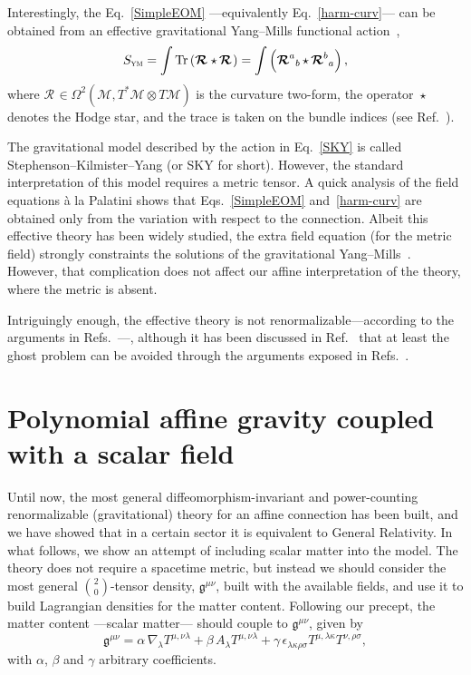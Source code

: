 \documentclass[aps,prd,12pt,twocolumn,superscriptaddress,showpacs,showkeys,reprint%
]{revtex4-1}
\DeclareMathOperator{\st}{\star}
\newcommand{\Mi}{\mathcal{M}}
\newcommand{\Rif}[2]{\boldsymbol{\mathcal{R}}^{{#1}}{}_{{#2}}}
\newcommand{\Tr}{\operatorname{Tr}}
\renewcommand{\(}{\left(}
\renewcommand{\)}{\right)}
\renewcommand{\[}{\left[}
\renewcommand{\]}{\right]}
\begin{document}
Interestingly, the Eq.~\eqref{SimpleEOM} ---equivalently Eq.~\eqref{harm-curv}--- can be obtained from an effective gravitational Yang--Mills functional action~\cite{stephenson1958quadratic,kilmister1961use,Yang1974}, %
\begin{equation}
  \label{SKY}
  S_{\textsc{ym}} = \int \Tr \left( \Rif{}{} \st \Rif{}{} \right) = \int \left( \Rif{a}{b} \st \Rif{b}{a} \right),
\end{equation}
where $\Rif{}{} \in \Omega^2(\Mi, T^*\Mi \otimes T\Mi)$ is the curvature two-form, the operator $\st$ denotes the Hodge star, and the trace is taken on the bundle indices (see Ref.~\cite{bourguignon1982yang}).

The gravitational model described by the action in Eq.~\eqref{SKY} is called Stephenson--Kilmister--Yang (or SKY for short). However, the standard interpretation of this model requires a metric tensor. A quick analysis of the field equations \`a la Palatini shows that Eqs.~\eqref{SimpleEOM} and~\eqref{harm-curv} are obtained only from the variation with respect to the connection. Albeit this effective theory has been widely studied, the extra field equation (for the metric field) strongly constraints the solutions of the gravitational Yang--Mills~\cite{JZcomm}. However, that complication does not affect our affine interpretation of the theory, where the metric is absent.

Intriguingly enough, the effective theory is not renormalizable---according to the arguments in Refs.~\cite{McGady:2013sga,Camanho:2014apa}---, although it has been discussed in Ref.~\cite{Chen:2010at} that at least the ghost problem can be avoided through the arguments exposed in Refs.~\cite{Kleinert:1987eb,Bender:2007wu,Bender:2008vh,Mannheim:2009zj}.


\section{\label{matter}Polynomial affine gravity coupled with a scalar field}

Until now, the most general diffeomorphism-invariant and power-counting renormalizable (gravitational) theory for an affine connection has been built, and we have showed that in a certain sector it is equivalent to General Relativity. In what follows, we show an attempt of including scalar matter into the model. The theory does not require a spacetime metric, but instead we should consider the most general $\binom{2}{0}$-tensor density, $\mathfrak{g}^{\mu\nu}$,  built with the available fields, and use it to build Lagrangian densities for the matter content. Following our precept, the matter content ---scalar matter--- should couple to $\mathfrak{g}^{\mu\nu}$, given by
\begin{dmath}
  \mathfrak{g}^{\mu\nu} = \alpha \, \nabla_\lambda T^{\mu,\nu\lambda} + \beta \, A_\lambda T^{\mu,\nu\lambda} + \gamma \, \epsilon_{\lambda\kappa\rho\sigma} T^{\mu, \lambda\kappa} T^{\nu, \rho\sigma},
  \label{geng}
\end{dmath}
with $\alpha$, $\beta$ and $\gamma$ arbitrary coefficients.
\end{document}
